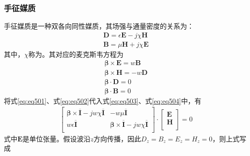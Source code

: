 \documentclass{article}
\numberwithin{equation}{section}
\renewcommand{\vec}[1]{\boldsymbol{#1}}
\begin{document}
\subsubsection{手征媒质}
手征媒质是一种双各向同性媒质，其场强与通量密度的关系为：
\begin{align}
    \label{eq:eq501}
    \mathbf{D}=\epsilon\mathbf{E}-j\chi\mathbf{H} \\
    \label{eq:eq502}
    \mathbf{B}=\mu\mathbf{H}+j\chi\mathbf{E}
\end{align}
其中，$\chi$称为\textbf{\color{blue}{手征参量}}。其对应的麦克斯韦方程为
\begin{align}
    \label{eq:eq503}
    \vec{\beta}\times\mathbf{E}=w\mathbf{B} \\
    \label{eq:eq504}
    \vec{\beta}\times\mathbf{H}=-w\mathbf{D} \\
    \label{eq:eq505}
    \vec{\beta}\cdot\mathbf{D}=0 \\
    \label{eq:eq506}
    \vec{\beta}\cdot\mathbf{B}=0
\end{align}
将式\ref{eq:eq501}、式\ref{eq:eq502}代入式\ref{eq:eq503}、式\ref{eq:eq504}中，有
\begin{align}
    \label{eq:eq507}
    \left[
        \begin{matrix}
            \vec{\beta}\times\overline{\mathbf{I}}-jw\chi\overline{\mathbf{I}} & -w\mu\overline{\mathbf{I}} \\
            w\epsilon\overline{\mathbf{I}} & \vec{\beta}\times\overline{\mathbf{I}}-jw\chi\overline{\mathbf{I}} \\
        \end{matrix}
    \right]\cdot
    \left[
        \begin{matrix}
            \mathbf{E} \\
            \mathbf{H} \\
        \end{matrix}
    \right]=0
\end{align}
式中$\mathbf{E}$是单位张量。假设波沿$z$方向传播，因此$D_z=B_z=E_z=H_z=0$，则上式写成
\end{document}
